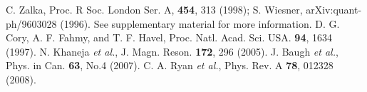 \documentclass[prl,twocolumn,showpacs]{revtex4}
\begin{document}
\begin{thebibliography}{99}
 C. Zalka, Proc. R Soc. London Ser. A, \textbf{454}, 313 (1998); S. Wiesner, arXiv:quant-ph/9603028 (1996).
  See supplementary material for more information.
 D. G. Cory, A. F. Fahmy, and T. F. Havel, Proc. Natl. Acad. Sci. USA. \textbf{94}, 1634 (1997).
 N. Khaneja \emph{et al.}, J. Magn. Reson. \textbf{172}, 296 (2005).
 J. Baugh \emph{et al.}, Phys. in Can. \textbf{63}, No.4
(2007).
 C. A. Ryan \emph{et al.}, Phys. Rev. A \textbf{78}, 012328 (2008).
\end{thebibliography}
\end{document}
